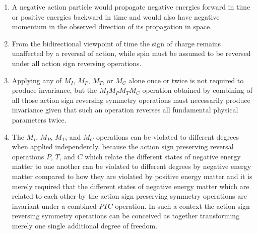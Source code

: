 \documentclass[notitlepage,12pt]{report}
\begin{document}
\begin{enumerate}
\item A negative action particle would propagate negative energies forward in time or positive energies backward in time and would also have negative momentum in the observed direction of its propagation in space.

\item From the bidirectional viewpoint of time the sign of charge remains unaffected by a reversal of action, while spin must be assumed to be reversed under all action sign reversing operations.

\item Applying any of $M_I$, $M_P$, $M_T$, or $M_C$ alone once or twice is not required to produce invariance, but the $M_{I}M_{P}M_{T}M_{C}$ operation obtained by combining of all those action sign reversing symmetry operations must necessarily produce invariance given that such an operation reverses all fundamental physical parameters twice.

\item The $M_I$, $M_P$, $M_T$, and $M_C$ operations can be violated to different degrees when applied independently, because the action sign preserving reversal operations $P$, $T$, and $C$ which relate the different states of negative energy matter to one another can be violated to different degrees by negative energy matter compared to how they are violated by positive energy matter and it is merely required that the different states of negative energy matter which are related to each other by the action sign preserving symmetry operations are invariant under a combined $PTC$ operation. In such a context the action sign reversing symmetry operations can be conceived as together transforming merely one single additional degree of freedom.


\end{enumerate}
\end{document}
